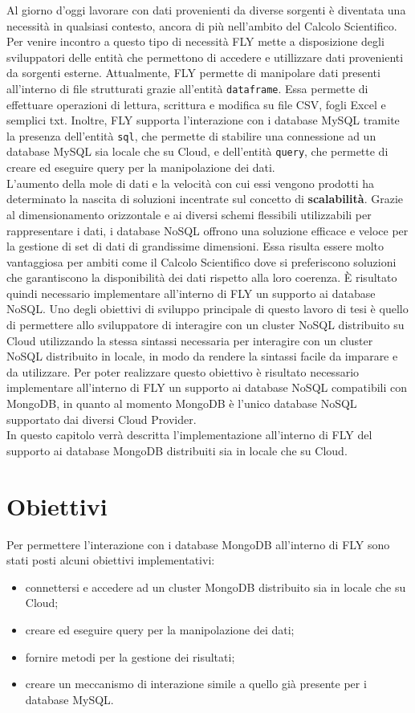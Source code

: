 Al giorno d'oggi lavorare con dati provenienti da diverse sorgenti è diventata una necessità in qualsiasi contesto, ancora di più nell'ambito del Calcolo Scientifico. Per venire incontro a questo tipo di necessità FLY mette a disposizione degli sviluppatori delle entità che permettono di accedere e utillizzare dati provenienti da sorgenti esterne. Attualmente, FLY permette di manipolare dati presenti all'interno di file strutturati grazie all'entità \verb|dataframe|. Essa permette di effettuare operazioni di lettura, scrittura e modifica su file CSV, fogli Excel e semplici txt. Inoltre, FLY supporta l'interazione con i database MySQL tramite la presenza dell'entità \verb|sql|, che permette di stabilire una connessione ad un database MySQL sia locale che su Cloud, e dell'entità \verb|query|, che permette di creare ed eseguire query per la manipolazione dei dati. \\
L'aumento della mole di dati e la velocità con cui essi vengono prodotti ha determinato la nascita di soluzioni incentrate sul concetto di \textbf{scalabilità}. Grazie al dimensionamento orizzontale e ai diversi schemi flessibili utilizzabili per rappresentare i dati, i database NoSQL offrono una soluzione efficace e veloce per la gestione di set di dati di grandissime dimensioni. Essa risulta essere molto vantaggiosa per ambiti come il Calcolo Scientifico dove si preferiscono soluzioni che garantiscono la disponibilità dei dati rispetto alla loro coerenza. È risultato quindi necessario implementare all’interno di FLY un supporto ai database NoSQL. Uno degli obiettivi di sviluppo principale di questo lavoro di tesi è quello di permettere allo sviluppatore di interagire con un cluster NoSQL distribuito su Cloud utilizzando la stessa sintassi necessaria per interagire con un cluster NoSQL distribuito in locale, in modo da rendere la sintassi facile da imparare e da utilizzare. Per poter realizzare questo obiettivo è risultato necessario implementare all'interno di FLY un supporto ai database NoSQL compatibili con MongoDB, in quanto al momento MongoDB è l'unico database NoSQL supportato dai diversi Cloud Provider. \\
In questo capitolo verrà descritta l'implementazione all'interno di FLY del supporto ai database MongoDB distribuiti sia in locale che su Cloud.

\section{Obiettivi}
Per permettere l'interazione con i database MongoDB all'interno di FLY sono stati posti alcuni obiettivi implementativi:
\begin{itemize}
    \item connettersi e accedere ad un cluster MongoDB distribuito sia in locale che su Cloud;
    \item creare ed eseguire query per la manipolazione dei dati;
    \item fornire metodi per la gestione dei risultati;
    \item creare un meccanismo di interazione simile a quello già presente per i database MySQL.
\end{itemize}

